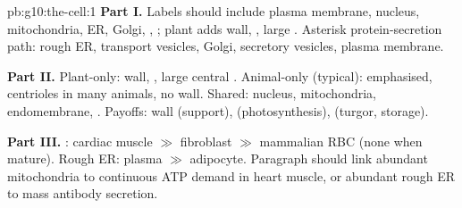 \begin{solution}{pb:g10:the-cell:1}
\textbf{Part I.} Labels should include plasma membrane, nucleus,
mitochondria, ER, Golgi, , ; plant adds wall,
, large . Asterisk protein-secretion path: rough ER,
transport vesicles, Golgi, secretory vesicles, plasma membrane.

\textbf{Part II.} Plant-only: wall, , large central .
Animal-only (typical):  emphasised, centrioles in many animals,
no wall. Shared: nucleus, mitochondria, endomembrane, .
Payoffs: wall (support),  (photosynthesis),  (turgor,
storage).

\textbf{Part III.} : cardiac muscle $\gg$ fibroblast $\gg$
mammalian RBC (none when mature). Rough ER: plasma  $\gg$ adipocyte.
Paragraph should link abundant mitochondria to continuous ATP demand in
heart muscle, or abundant rough ER to mass antibody secretion.
\end{solution}
